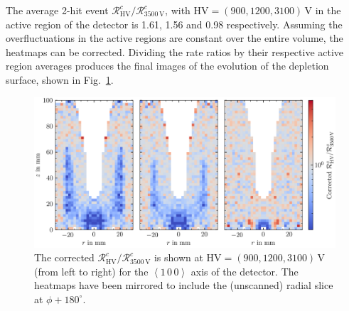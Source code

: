 The average 2-hit event $\mathcal{R}^c_{\text{HV}}/\mathcal{R}^c_{3500\,\text{V}}$, with $\text{HV} = (900, 1200, 3100)$\,V in the active region of the detector is 1.61, 1.56 and 0.98 respectively. Assuming the overfluctuations in the active regions are constant over the entire volume, the heatmaps can be corrected. Dividing the rate ratios by their respective active region averages produces the final images of the evolution of the depletion surface, shown in Fig.~\ref{fig:bubbles_prog}.
\begin{figure}[htb]
    \centering
    \includegraphics[width=6in]{figs/bubbles/bubbles_prog.png}
    \caption{The corrected $\mathcal{R}^c_{\text{HV}}/\mathcal{R}^c_{3500\,\text{V}}$ is shown at $\text{HV} = (900, 1200, 3100)$\,V (from left to right) for the $\left<1\,0\,0\right>$ axis of the detector. The heatmaps have been mirrored to include the (unscanned) radial slice at $\phi+180^\circ$.}
	\label{fig:bubbles_prog}
\end{figure} 